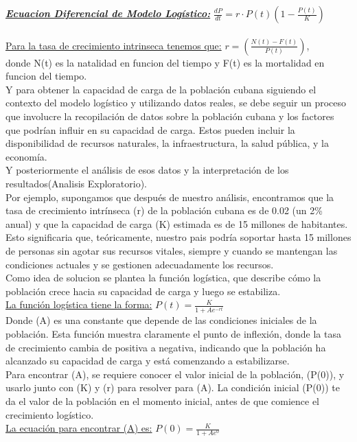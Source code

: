 \documentclass{article}
\begin{document}
\textit{\textbf{\underline{Ecuacion Diferencial de Modelo Logístico:}}} $\frac{dP}{dt} = r \cdot P(t)(1 - \frac{P(t)}{K}) $\\\\
\underline{Para la tasa de crecimiento intrinseca tenemos que:} $r = (\frac{N(t)-F(t)}{P(t)})$,\\ 
donde N(t) es la natalidad en funcion del tiempo y F(t) es la mortalidad en funcion del tiempo.\\
Y para obtener la capacidad de carga de la población cubana siguiendo el contexto del modelo logístico y utilizando 
datos reales, se debe seguir un proceso que involucre la recopilación de datos sobre la población cubana y 
los factores que podrían influir en su capacidad de carga. Estos pueden incluir la disponibilidad de recursos 
naturales, la infraestructura, la salud pública, y la economía.\\
Y posteriormente el análisis de esos datos y la interpretación de los resultados(Analisis Exploratorio).\\
Por ejemplo, supongamos que después de nuestro análisis, encontramos que la tasa de crecimiento intrínseca (r) de la población 
cubana es de 0.02 (un 2\% anual) y que la capacidad de carga (K) estimada es de 15 millones de habitantes. 
Esto significaria que, teóricamente, nuestro pais podría soportar hasta 15 millones de personas sin agotar sus recursos 
vitales, siempre y cuando se mantengan las condiciones actuales y se gestionen adecuadamente los recursos.
\\ 
Como idea de solucion se plantea la función logística, que describe cómo la población crece hacia su capacidad de 
carga y luego se estabiliza.\\ 
\underline{La función logística tiene la forma:} $P(t) = \frac{K}{1 + Ae^{-rt}}$ \\
Donde (A) es una constante que depende de las condiciones iniciales de la población. Esta función muestra claramente 
el punto de inflexión, donde la tasa de crecimiento cambia de positiva a negativa, indicando que la población 
ha alcanzado su capacidad de carga y está comenzando a estabilizarse.\\
Para encontrar (A), se requiere conocer el valor inicial de la población, (P(0)), y usarlo junto con (K) y (r) 
para resolver para (A). La condición inicial (P(0)) te da el valor de la población en el momento inicial, antes de 
que comience el crecimiento logístico.\\
\underline{La ecuación para encontrar (A) es:} $P(0) = \frac{K}{1 + Ae^{0}}$\\
\end{document}

